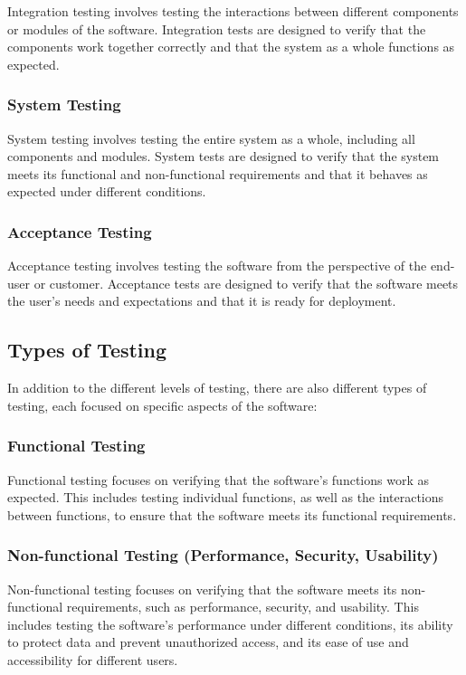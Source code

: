 \begin{refsection}
\begin{multicols}{2}
{Integration testing involves testing the interactions between different components or modules of the software. Integration tests are designed to verify that the components work together correctly and that the system as a whole functions as expected.

\subsubsection{System Testing}

System testing involves testing the entire system as a whole, including all components and modules. System tests are designed to verify that the system meets its functional and non-functional requirements and that it behaves as expected under different conditions.

\subsubsection{Acceptance Testing}

Acceptance testing involves testing the software from the perspective of the end-user or customer. Acceptance tests are designed to verify that the software meets the user's needs and expectations and that it is ready for deployment.

\subsection{Types of Testing}

In addition to the different levels of testing, there are also different types of testing, each focused on specific aspects of the software:

\subsubsection{Functional Testing}

Functional testing focuses on verifying that the software's functions work as expected. This includes testing individual functions, as well as the interactions between functions, to ensure that the software meets its functional requirements.

\subsubsection{Non-functional Testing (Performance, Security, Usability)}

Non-functional testing focuses on verifying that the software meets its non-functional requirements, such as performance, security, and usability. This includes testing the software's performance under different conditions, its ability to protect data and prevent unauthorized access, and its ease of use and accessibility for different users.

}
\end{multicols}
\end{refsection}
